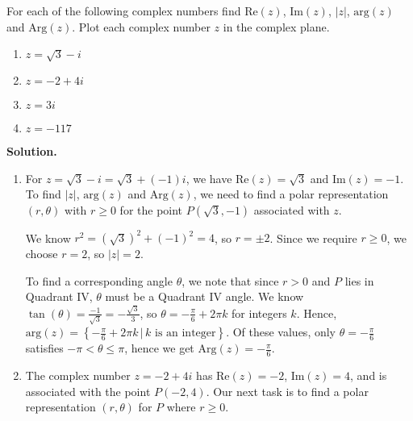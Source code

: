 \documentclass{ximera}
\begin{document}
\begin{example} \label{plotmodargex}  For each of the following complex numbers find $\text{Re}(z)$, $\text{Im}(z)$, $|z|$, $\text{arg}(z)$ and $\text{Arg}(z)$.  Plot each complex number $z$ in the complex plane.

\begin{multicols}{4}

\begin{enumerate}

\item  $z = \sqrt{3}-i$

\item  $z = -2+4i$

\item  $z = 3i$

\item  $z = -117$

\end{enumerate}

\end{multicols}

{\bf Solution.} 

\begin{enumerate}

\item For $z = \sqrt{3} -i = \sqrt{3} + (-1)i$, we have $\text{Re}(z) = \sqrt{3}$ and $\text{Im}(z) = -1$.    To find $|z|$, $\text{arg}(z)$ and $\text{Arg}(z)$, we need to find a polar representation $(r,\theta)$ with $r \geq 0$ for the point $P(\sqrt{3},-1)$ associated with $z$.   

\smallskip

We know $r^2 = (\sqrt{3})^2 + (-1)^2 = 4$, so $r = \pm 2$.  Since we require $r \geq 0$, we choose $r =2$, so $|z| = 2$.

\smallskip

To find a corresponding angle $\theta$, we note that since $r>0$ and $P$ lies in Quadrant IV, $\theta$ must be a Quadrant IV angle.  We know $\tan(\theta) = \frac{-1}{\sqrt{3}} = -\frac{\sqrt{3}}{3}$, so $\theta = -\frac{\pi}{6} + 2\pi k$ for integers $k$.  Hence, $\text{arg}(z) = \left\{-\frac{\pi}{6} + 2\pi k \, | \, \text{$k$ is an integer} \right\}$. Of these values, only  $\theta = -\frac{\pi}{6}$  satisfies  $-\pi < \theta \leq \pi$, hence we get $\text{Arg}(z) = -\frac{\pi}{6}$.  

\item The complex number $z = -2+4i$ has  $\text{Re}(z) = -2$,   $\text{Im}(z) = 4$, and is associated with the point $P(-2,4)$.  Our next task is to find a polar representation $(r,\theta)$ for $P$ where $r \geq 0$.


\end{enumerate}
\end{example}
\end{document}

